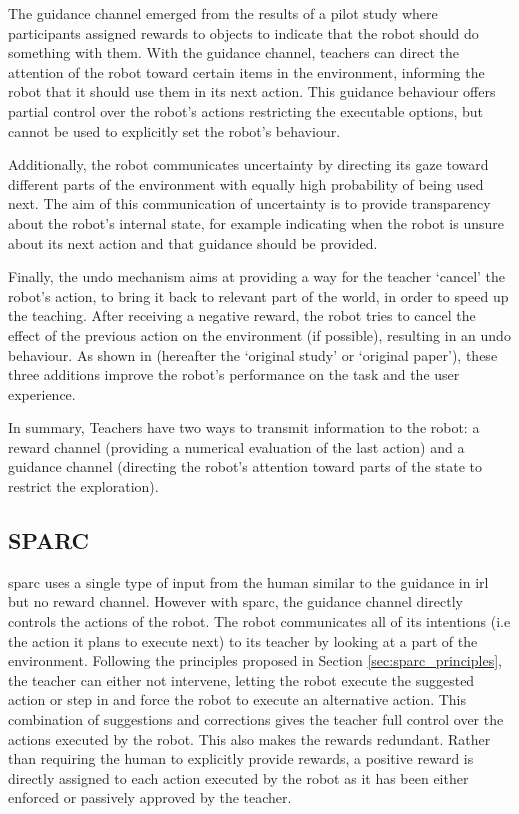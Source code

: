 The guidance channel emerged from the results of a pilot study where participants assigned rewards to objects to indicate that the robot should do something with them. With the guidance channel, teachers can direct the attention of the robot toward certain items in the environment, informing the robot that it should use them in its next action. This guidance behaviour offers partial control over the robot's actions restricting the executable options, but cannot be used to explicitly set the robot's behaviour. 

Additionally, the robot communicates uncertainty by directing its gaze toward different parts of the environment with equally high probability of being used next. The aim of this communication of uncertainty is to provide transparency about the robot's internal state, for example indicating when the robot is unsure about its next action and that guidance should be provided. 

Finally, the undo mechanism aims at providing a way for the teacher `cancel' the robot's action, to bring it back to relevant part of the world, in order to speed up the teaching. After receiving a negative reward, the robot tries to cancel the effect of the previous action on the environment (if possible), resulting in an undo behaviour. As shown in \cite{thomaz2008teachable} (hereafter the `original study' or `original paper'), these three additions improve the robot's performance on the task and the user experience.

In summary, Teachers have two ways to transmit information to the robot: a reward channel (providing a numerical evaluation of the last action) and a guidance channel (directing the robot's attention toward parts of the state to restrict the exploration).

\subsection{SPARC}

\gls{sparc} uses a single type of input from the human similar to the guidance in \gls{irl} but no reward channel. However with \gls{sparc}, the guidance channel directly controls the actions of the robot. The robot communicates all of its intentions (i.e the action it plans to execute next) to its teacher by looking at a part of the environment. Following the principles proposed in Section \ref{sec:sparc_principles}, the teacher can either not intervene, letting the robot execute the suggested action or step in and force the robot to execute an alternative action. This combination of suggestions and corrections gives the teacher full control over the actions executed by the robot. This also makes the rewards redundant. Rather than requiring the human to explicitly provide rewards, a positive reward is directly assigned to each action executed by the robot as it has been either enforced or passively approved by the teacher.

